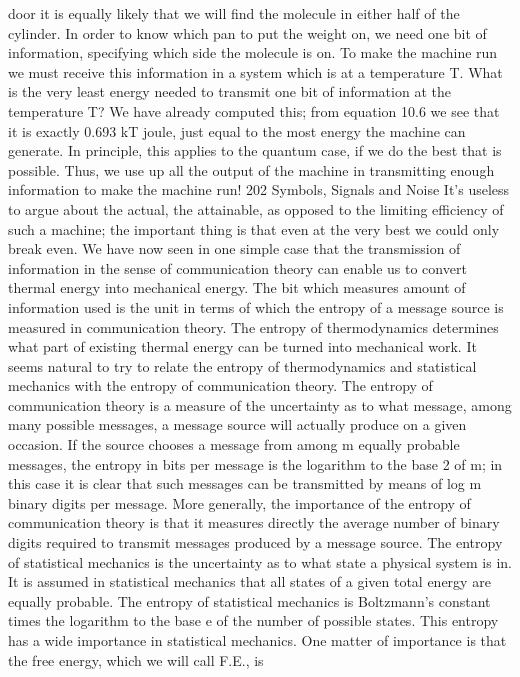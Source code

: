 {{{{{{{{{{{door it is equally likely that we will find the molecule in either half
of the cylinder. In order to know which pan to put the weight on,
we need one bit of information, specifying which side the molecule
is on. To make the machine run we must receive this information
in a system which is at a temperature T. What is the very least
energy needed to transmit one bit of information at the temperature
T? We have already computed this; from equation 10.6 we
see that it is exactly 0.693 kT joule, just equal to the most energy
the machine can generate. In principle, this applies to the quantum
case, if we do the best that is possible. Thus, we use up all the
output of the machine in transmitting enough information to make
the machine run!
202
Symbols, Signals and Noise
It’s useless to argue about the actual, the attainable, as opposed
to the limiting efficiency of such a machine; the important thing
is that even at the very best we could only break even.
We have now seen in one simple case that the transmission of
information in the sense of communication theory can enable us
to convert thermal energy into mechanical energy. The bit which
measures amount of information used is the unit in terms of which
the entropy of a message source is measured in communication
theory. The entropy of thermodynamics determines what part of
existing thermal energy can be turned into mechanical work. It
seems natural to try to relate the entropy of thermodynamics and
statistical mechanics with the entropy of communication theory.
The entropy of communication theory is a measure of the uncertainty
as to what message, among many possible messages, a
message source will actually produce on a given occasion. If the
source chooses a message from among m equally probable messages,
the entropy in bits per message is the logarithm to the base
2 of m; in this case it is clear that such messages can be transmitted
by means of log m binary digits per message. More generally, the
importance of the entropy of communication theory is that it
measures directly the average number of binary digits required to
transmit messages produced by a message source.
The entropy of statistical mechanics is the uncertainty as to what
state a physical system is in. It is assumed in statistical mechanics
that all states of a given total energy are equally probable. The
entropy of statistical mechanics is Boltzmann’s constant times the
logarithm to the base e of the number of possible states. This
entropy has a wide importance in statistical mechanics. One matter
of importance is that the free energy, which we will call F.E., is
}}}}}}}}}}}
